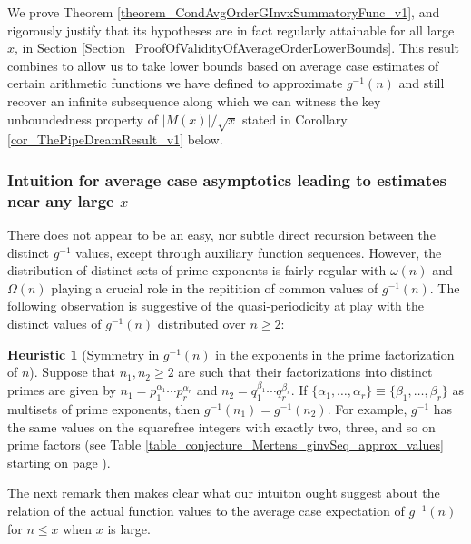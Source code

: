 \documentclass[11pt,reqno,a4letter]{article}
\numberwithin{figure}{section}
\numberwithin{table}{section}
\theoremstyle{plain}
\numberwithin{theorem}{section}
\theoremstyle{definition}
\newtheorem{heuristic}[theorem]{Heuristic}
\begin{document}
We prove Theorem \ref{theorem_CondAvgOrderGInvxSummatoryFunc_v1}, and 
rigorously justify that its hypotheses are in fact regularly attainable for all large $x$, in 
Section \ref{Section_ProofOfValidityOfAverageOrderLowerBounds}.  
This result combines to allow us to take lower bounds based on average case estimates of 
certain arithmetic functions we have defined to approximate $g^{-1}(n)$ and still recover 
an infinite subsequence along which we can witness the key unboundedness property 
of $|M(x)| / \sqrt{x}$ stated in 
Corollary \ref{cor_ThePipeDreamResult_v1} below. 

\subsubsection{Intuition for average case asymptotics leading to estimates near any large $x$} 

There does not appear to be an easy, nor subtle 
direct recursion between the distinct $g^{-1}$ values, except through auxiliary function sequences. 
However, the distribution of distinct sets of prime exponents is fairly regular with 
$\omega(n)$ and $\Omega(n)$ playing a crucial role in the repitition of common values of 
$g^{-1}(n)$. 
The following observation is suggestive of the quasi-periodicity at play 
with the distinct values of $g^{-1}(n)$ distributed over $n \geq 2$: 

\begin{heuristic}[Symmetry in $g^{-1}(n)$ in the exponents in the prime factorization of $n$] 
Suppose that $n_1, n_2 \geq 2$ are such that their factorizations into distinct primes are 
given by $n_1 = p_1^{\alpha_1} \cdots p_r^{\alpha_r}$ and $n_2 = q_1^{\beta_1} \cdots q_r^{\beta_r}$. 
If $\{\alpha_1, \ldots, \alpha_r\} \equiv \{\beta_1, \ldots, \beta_r\}$ as multisets of prime exponents, 
then $g^{-1}(n_1) = g^{-1}(n_2)$. For example, $g^{-1}$ has the same values on the squarefree integers 
with exactly two, three, and so on prime factors 
(see Table \ref{table_conjecture_Mertens_ginvSeq_approx_values} starting on page 
\pageref{table_conjecture_Mertens_ginvSeq_approx_values}). 
\end{heuristic} 

The next remark then makes clear what our intuiton ought suggest about the relation of 
the actual function values to the average case expectation of $g^{-1}(n)$ for $n \leq x$ when 
$x$ is large. 
\end{document}
